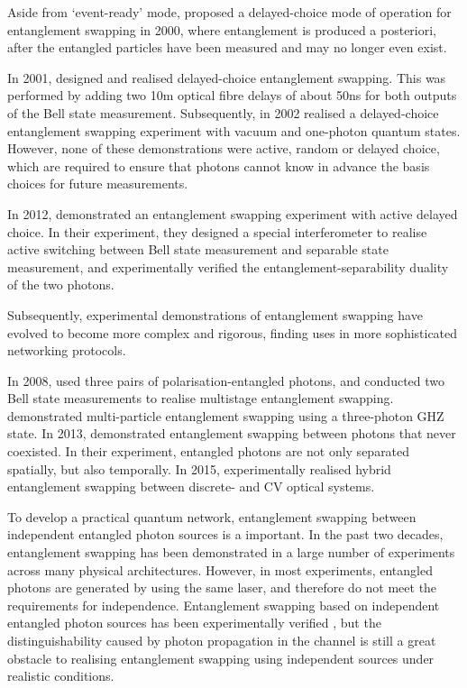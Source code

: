 \documentclass[aps,rmp,twocolumn,amsmath,amssymb,nofootinbib,superscriptaddress,longbibliography,floatfix,table-of-contents,eqsecnum]{revtex4-1}
\begin{document}
Aside from `event-ready' mode, \cite{bib:JMO_47_2} proposed a delayed-choice mode of operation for entanglement swapping in 2000, where entanglement is produced a posteriori, after the entangled particles have been measured and may no longer even exist.

In 2001, \cite{bib:PRL_88_017903} designed and realised delayed-choice entanglement swapping. This was performed by adding two 10m optical fibre delays of about 50ns for both outputs of the Bell state measurement. Subsequently, in 2002 \cite{bib:PRA_66_024309} realised a delayed-choice entanglement swapping experiment with vacuum and one-photon quantum states. However, none of these demonstrations were active, random or delayed choice, which are required to ensure that photons cannot know in advance the basis choices for future measurements.

In 2012, \cite{bib:Nat_Phys_8_479} demonstrated an entanglement swapping experiment with active delayed choice. In their experiment, they designed a special interferometer to realise active switching between Bell state measurement and separable state measurement, and experimentally verified the entanglement-separability duality of the two photons. 

Subsequently, experimental demonstrations of entanglement swapping have evolved to become more complex and rigorous, finding uses in more sophisticated networking protocols.

In 2008, \cite{bib:PRL_101_080403} used three pairs of polarisation-entangled photons, and conducted two Bell state measurements to realise multistage entanglement swapping. \cite{bib:PRL_103_020501} demonstrated multi-particle entanglement swapping using a three-photon GHZ state. In 2013, \cite{bib:PRL_110_210403} demonstrated entanglement swapping between photons that never coexisted. In their experiment, entangled photons are not only separated spatially, but also temporally. In 2015, \cite{bib:PRL_114_100501} experimentally realised hybrid entanglement swapping between discrete- and CV optical systems.

To develop a practical quantum network, entanglement swapping between independent entangled photon sources is a important. In the past two decades, entanglement swapping has been demonstrated in a large number of experiments across many physical architectures. However, in most experiments, entangled photons are generated by using the same laser, and therefore do not meet the requirements for independence. Entanglement swapping based on independent entangled photon sources has been experimentally verified \cite{bib:PRL_96_110501, bib:Nat_Phys_3_692, bib:PRA_79_040302}, but the distinguishability caused by photon propagation in the channel is still a great obstacle to realising entanglement swapping using independent sources under realistic conditions.
\end{document}
